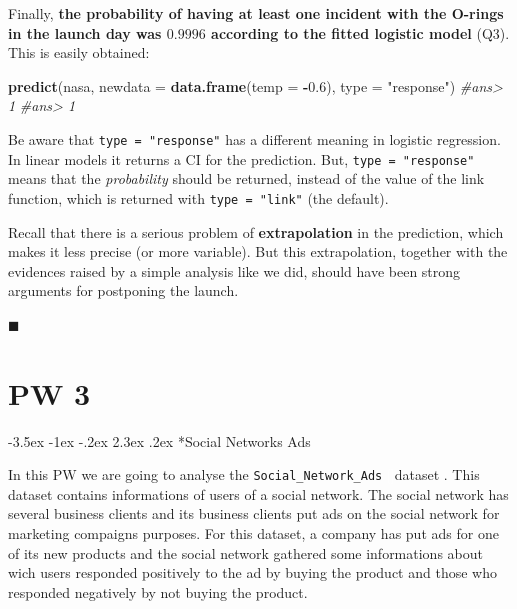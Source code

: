 \documentclass[]{book}
\makeatletter
\newenvironment{Shaded}{\begin{snugshade}}{\end{snugshade}}
\newcommand{\KeywordTok}[1]{\textcolor[rgb]{0.13,0.29,0.53}{\textbf{#1}}}
\newcommand{\DataTypeTok}[1]{\textcolor[rgb]{0.13,0.29,0.53}{#1}}
\newcommand{\FloatTok}[1]{\textcolor[rgb]{0.00,0.00,0.81}{#1}}
\newcommand{\StringTok}[1]{\textcolor[rgb]{0.31,0.60,0.02}{#1}}
\newcommand{\CommentTok}[1]{\textcolor[rgb]{0.56,0.35,0.01}{\textit{#1}}}
\newcommand{\OperatorTok}[1]{\textcolor[rgb]{0.81,0.36,0.00}{\textbf{#1}}}
\newcommand{\NormalTok}[1]{#1}
\renewcommand\section{\@startsection {section}{1}{\z@}%
                                   {-3.5ex \@plus -1ex \@minus -.2ex}%
                                   {2.3ex \@plus.2ex}%
                                   {\normalfont\Large\bfseries\color{ForestGreen}}}
\theoremstyle{definition}
\theoremstyle{definition}
\theoremstyle{definition}
\theoremstyle{remark}
\makeatother
\begin{document}
\begin{Shaded}
\end{Shaded}

Finally, \textbf{the probability of having at least one incident with
the O-rings in the launch day was \(0.9996\) according to the fitted
logistic model} (Q3). This is easily obtained:

\begin{Shaded}
\begin{Highlighting}[]
\KeywordTok{predict}\NormalTok{(nasa, }\DataTypeTok{newdata =} \KeywordTok{data.frame}\NormalTok{(}\DataTypeTok{temp =} \OperatorTok{-}\FloatTok{0.6}\NormalTok{), }\DataTypeTok{type =} \StringTok{"response"}\NormalTok{)}
\CommentTok{#ans> 1 }
\CommentTok{#ans> 1}
\end{Highlighting}
\end{Shaded}

Be aware that \texttt{type\ =\ "response"} has a different meaning in
logistic regression. In linear models it returns a CI for the
prediction. But, \texttt{type\ =\ "response"} means that the
\emph{probability} should be returned, instead of the value of the link
function, which is returned with \texttt{type\ =\ "link"} (the default).

Recall that there is a serious problem of \textbf{extrapolation} in the
prediction, which makes it less precise (or more variable). But this
extrapolation, together with the evidences raised by a simple analysis
like we did, should have been strong arguments for postponing the
launch.

◼

\chapter*{PW 3}\label{pw-3}

\section*{Social Networks Ads}\label{social-networks-ads}

In this PW we are going to analyse the \texttt{Social\_Network\_Ads}
\textcolor{white}{[}\faTable\textcolor{white}{]}dataset . This dataset
contains informations of users of a social network. The social network
has several business clients and its business clients put ads on the
social network for marketing compaigns purposes. For this dataset, a
company has put ads for one of its new products and the social network
gathered some informations about wich users responded positively to the
ad by buying the product and those who responded negatively by not
buying the product.
\end{document}
